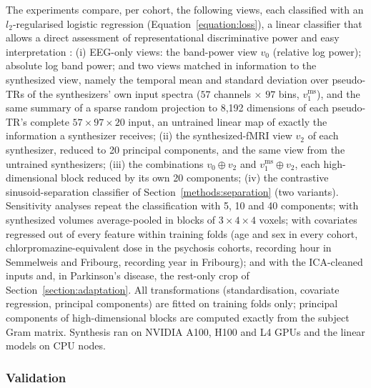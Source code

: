 \documentclass[pdflatex,referee,sn-basic]{sn-jnl}%
\begin{document}
The experiments compare, per cohort, the following views, each classified with an $l_2$-regularised logistic regression (Equation~\ref{equation:loss}), a linear classifier that allows a direct assessment of representational discriminative power and easy interpretation \cite{treviso2020explanation}:
(i) EEG-only views: the band-power view $v_0$ (relative log power); absolute log band power; and two views matched in information to the synthesized view, namely the temporal mean and standard deviation over pseudo-TRs of the synthesizers' own input spectra ($57$ channels $\times$ $97$ bins, $v_1^{\mathrm{ms}}$), and the same summary of a sparse random projection \cite{li2006sparse} to 8,192 dimensions of each pseudo-TR's complete $57\times97\times20$ input, an untrained linear map of exactly the information a synthesizer receives;
(ii) the synthesized-fMRI view $v_2$ of each synthesizer, reduced to 20 principal components, and the same view from the untrained synthesizers;
(iii) the combinations $v_0 \oplus v_2$ and $v_1^{\mathrm{ms}} \oplus v_2$, each high-dimensional block reduced by its own 20 components;
(iv) the contrastive sinusoid-separation classifier of Section~\ref{methods:separation} (two variants).
Sensitivity analyses repeat the classification with 5, 10 and 40 components; with synthesized volumes average-pooled in blocks of $3\times4\times4$ voxels; with covariates regressed out of every feature within training folds (age and sex in every cohort, chlorpromazine-equivalent dose in the psychosis cohorts, recording hour in Semmelweis and Fribourg, recording year in Fribourg); and with the ICA-cleaned inputs and, in Parkinson's disease, the rest-only crop of Section~\ref{section:adaptation}. All transformations (standardisation, covariate regression, principal components) are fitted on training folds only; principal components of high-dimensional blocks are computed exactly from the subject Gram matrix. Synthesis ran on NVIDIA A100, H100 and L4 GPUs and the linear models on CPU nodes.

\subsubsection{Validation}\label{section:validation}
\end{document}
